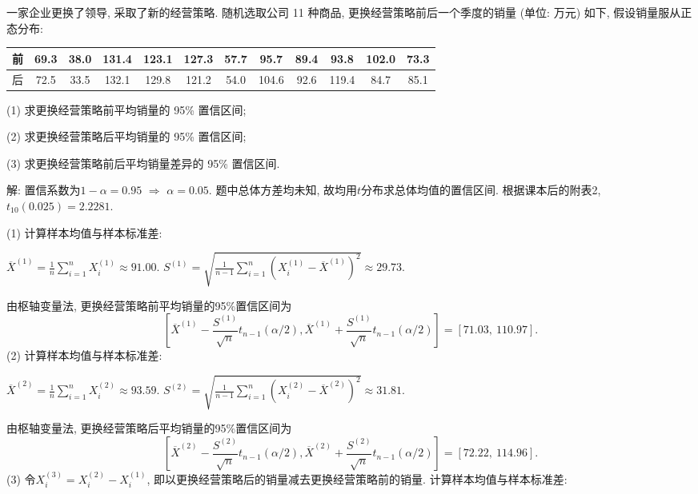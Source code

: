 \documentclass[standard]{ExBook}
\renewenvironment{shaded}{%
  \def\FrameCommand{\fboxsep=\FrameSep \colorbox{shadecolor}}%
  \MakeFramed{\advance\hsize-\width \FrameRestore}%
}{%
  \endMakeFramed
}
\begin{document}
\begin{qitems}
    \begin{bbox}
    \begin{shaded}
        \qitem
一家企业更换了领导, 采取了新的经营策略. 随机选取公司 11 种商品, 更换经营策略前后一个季度的销量 (单位: 万元) 如下, 假设销量服从正态分布:
\begin{center}
\setlength{\tabcolsep}{8pt}
\begin{tabular}{c|ccccccccccc}
    \hline
    前 & 69.3 & 38.0 & 131.4 & 123.1 & 127.3 & 57.7 & 95.7 & 89.4 & 93.8 & 102.0 & 73.3\\
    \hline
    后 & 72.5 & 33.5 & 132.1 & 129.8 & 121.2 & 54.0 & 104.6 & 92.6 & 119.4 & 84.7 & 85.1\\
    \hline
\end{tabular}
\end{center}
(1) 求更换经营策略前平均销量的 95\% 置信区间;

(2) 求更换经营策略后平均销量的 95\% 置信区间;

(3) 求更换经营策略前后平均销量差异的 95\% 置信区间.
    \end{shaded}
    \end{bbox}

\vspace{\dimexpr2.5cm-5em\relax}

解: 置信系数为$1-\alpha=0.95$ $\Longrightarrow$ $\alpha=0.05$. 题中总体方差均未知, 故均用$t$分布求总体均值的置信区间. 根据课本后的附表2, $t_{10}(0.025)=2.2281$.

(1) 计算样本均值与样本标准差:

$\overline{X}^{(1)}=\frac{1}{n}\sum_{i=1}^nX_i^{(1)}\approx91.00$. 
$S^{(1)}=\sqrt{\frac{1}{n-1}\sum_{i=1}^n(X_i^{(1)}-\overline{X}^{(1)})^2}\approx29.73$.

由枢轴变量法, 更换经营策略前平均销量的95\%置信区间为
$$
\left[
\overline{X}^{(1)}-\frac{S^{(1)}}{\sqrt{n}}t_{n-1}(\alpha/2),
\overline{X}^{(1)}+\frac{S^{(1)}}{\sqrt{n}}t_{n-1}(\alpha/2)
\right]
=
[71.03,\ 110.97].
$$
(2) 计算样本均值与样本标准差:

$\overline{X}^{(2)}=\frac{1}{n}\sum_{i=1}^nX_i^{(2)}\approx93.59$. 
$S^{(2)}=\sqrt{\frac{1}{n-1}\sum_{i=1}^n(X_i^{(2)}-\overline{X}^{(2)})^2}\approx31.81$.

由枢轴变量法, 更换经营策略后平均销量的95\%置信区间为
$$
\left[
\overline{X}^{(2)}-\frac{S^{(2)}}{\sqrt{n}}t_{n-1}(\alpha/2),
\overline{X}^{(2)}+\frac{S^{(2)}}{\sqrt{n}}t_{n-1}(\alpha/2)
\right]
=
[72.22,\ 114.96].
$$
(3) 令$X_i^{(3)}=X_i^{(2)}-X_i^{(1)}$, 即以更换经营策略后的销量减去更换经营策略前的销量. 计算样本均值与样本标准差:


\end{qitems}
\end{document}

